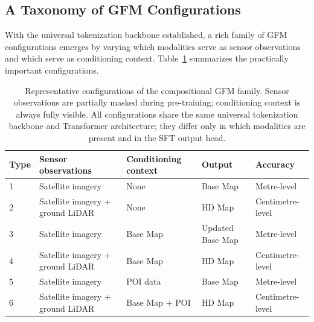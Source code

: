 \documentclass{book}
\begin{document}
\subsection{A Taxonomy of GFM Configurations}

With the universal tokenization backbone established, a rich family
of GFM configurations emerges by varying which modalities serve as
sensor observations and which serve as conditioning context.
Table~\ref{tab:gfm_types} summarizes the practically important
configurations.

\begin{table}[htbp]
  \centering
  \caption{Representative configurations of the compositional GFM
    family.  Sensor observations are partially masked during
    pre-training; conditioning context is always fully visible.
    All configurations share the same universal tokenization
    backbone and Transformer architecture; they differ only in
    which modalities are present and in the SFT output head.}
  \label{tab:gfm_types}
  \renewcommand{\arraystretch}{1.25}
  \begin{tabular}{p{1.2cm} p{3.6cm} p{2.8cm} p{2.2cm} p{1.8cm}}
    \hline
    \textbf{Type} &
    \textbf{Sensor observations} &
    \textbf{Conditioning context} &
    \textbf{Output} &
    \textbf{Accuracy} \\
    \hline
    1 &
    Satellite imagery &
    None &
    Base Map &
    Metre-level \\

    2 &
    Satellite imagery + ground LiDAR &
    None &
    HD Map &
    Centimetre-level \\

    3 &
    Satellite imagery &
    Base Map &
    Updated Base Map &
    Metre-level \\

    4 &
    Satellite imagery + ground LiDAR &
    Base Map &
    HD Map &
    Centimetre-level \\

    5 &
    Satellite imagery &
    POI data &
    Base Map &
    Metre-level \\

    6 &
    Satellite imagery + ground LiDAR &
    Base Map + POI &
    HD Map &
    Centimetre-level \\
    \hline
  \end{tabular}
\end{table}
\end{document}
